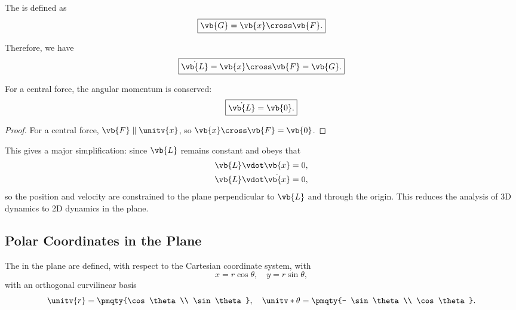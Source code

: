 \begin{definition}[Torque]
    The  is defined as
    \begin{equation}
        \boxed{\vb{G} = \vb{x} \cross \vb{F}.}
    \end{equation}
\end{definition}

Therefore, we have
\begin{equation}
    \boxed{\dot{\vb{L}} = \vb{x} \cross \vb{F} = \vb{G}.}
\end{equation}

\begin{theorem}
    \label{prop:conservation-angular-momentum-central-force}%
    For a central force, the angular momentum is conserved:
    \begin{equation}
        \boxed{\dot{\vb{L}} = \vb{0}.}
    \end{equation}  
\end{theorem}

\begin{proof}
    For a central force, \(\vb{F} \parallel \unitv{x}\), so \(\vb{x} \cross \vb{F} = \vb{0}\).
\end{proof}

This gives a major simplification: since \(\vb{L}\) remains constant and obeys that
\begin{subequations}\begin{align}
    \vb{L} \vdot \vb{x} &= 0, \\
    \vb{L} \vdot \dot{\vb{x}} &= 0,
\end{align}\end{subequations}
so the position and velocity are constrained to the plane perpendicular to \(\vb{L}\) and through the origin. This reduces the analysis of 3D dynamics to 2D dynamics in the plane.

\subsection{Polar Coordinates in the Plane}

\begin{definition}
    The  in the plane are defined, with respect to the Cartesian coordinate system, with
    \begin{equation}
        x = r \cos \theta, \quad y = r \sin \theta,
    \end{equation}
    with an orthogonal curvilinear basis
    \begin{equation}
        \unitv{r} = \pmqty{\cos \theta \\ \sin \theta}, \quad \unitv*{\theta} = \pmqty{- \sin \theta \\ \cos \theta}.
    \end{equation}
\end{definition}

